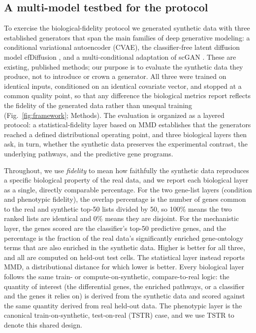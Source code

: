 \documentclass[11pt]{article}
\newcommand{\protname}{biological-fidelity protocol}
\begin{document}
\subsection{A multi-model testbed for the protocol}
To exercise the \protname{} we generated synthetic data with three established generators that span the main families of deep generative modeling: a conditional variational autoencoder (CVAE), the classifier-free latent diffusion model cfDiffusion \cite{cfdiffusion}, and a multi-conditional adaptation of scGAN \cite{scgan}. These are existing, published methods; our purpose is to evaluate the synthetic data they produce, not to introduce or crown a generator. All three were trained on identical inputs, conditioned on an identical covariate vector, and stopped at a common quality point, so that any difference the biological metrics report reflects the fidelity of the generated data rather than unequal training (Fig.~\ref{fig:framework}; Methods). The evaluation is organized as a layered protocol: a statistical-fidelity layer based on MMD establishes that the generators reached a defined distributional operating point, and three biological layers then ask, in turn, whether the synthetic data preserves the experimental contrast, the underlying pathways, and the predictive gene programs.

Throughout, we use \emph{fidelity} to mean how faithfully the synthetic data reproduces a specific biological property of the real data, and we report each biological layer as a single, directly comparable percentage. For the two gene-list layers (condition and phenotypic fidelity), the overlap percentage is the number of genes common to the real and synthetic top-50 lists divided by 50, so 100\% means the two ranked lists are identical and 0\% means they are disjoint. For the mechanistic layer, the genes scored are the classifier's top-50 predictive genes, and the percentage is the fraction of the real data's significantly enriched gene-ontology terms that are also enriched in the synthetic data. Higher is better for all three, and all are computed on held-out test cells. The statistical layer instead reports MMD, a distributional distance for which lower is better. Every biological layer follows the same train- or compute-on-synthetic, compare-to-real logic: the quantity of interest (the differential genes, the enriched pathways, or a classifier and the genes it relies on) is derived from the synthetic data and scored against the same quantity derived from real held-out data. The phenotypic layer is the canonical train-on-synthetic, test-on-real (TSTR) case, and we use TSTR to denote this shared design.
\end{document}
